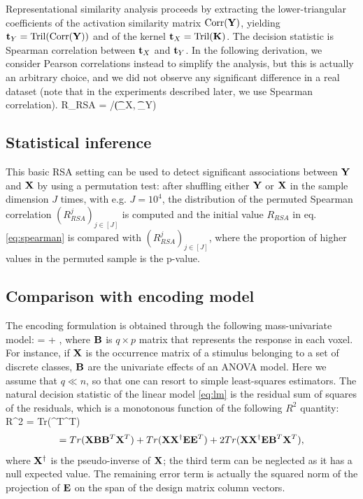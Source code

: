 \documentclass{article}
\begin{document}
Representational similarity analysis proceeds by extracting the
lower-triangular coefficients of the activation similarity matrix
$\text{Corr}(\mathbf{Y})$, yielding $\mathbf{t}_Y = \text{Tril} (\text{Corr}(\mathbf{Y}))$ and of the kernel $\mathbf{t}_X
=\text{Tril}(\mathbf{K})$.  The decision statistic is Spearman correlation
between $\mathbf{t}_X$ and $\mathbf{t}_Y$. 
%
In the following derivation, we consider Pearson correlations instead
to simplify the analysis, but this is actually an arbitrary choice, and
we did not observe any significant difference in a real dataset (note
that in the experiments described later, we use Spearman correlation).
\beq R_{RSA} = /(\t_X, \t_Y)
\label{eq:spearman}
\eeq


\subsection{Statistical inference}
This basic RSA setting can be used to detect significant associations
between $\mathbf{Y}$ and $\mathbf{X}$ by using a permutation test: after shuffling
either $\mathbf{Y}$ or $\mathbf{X}$ in the sample dimension $J$ times, with
e.g. $J=10^4$, the distribution of the permuted Spearman correlation
$(R_{RSA}^j)_{j \in [J]}$ is computed and the initial value $R_{RSA}$
in eq. \ref{eq:spearman} is compared with $(R_{RSA}^j)_{j \in [J]}$,
where the proportion of higher values in the permuted sample is the
p-value.

\subsection{Comparison with encoding model}
The encoding formulation is obtained through the following
mass-univariate model:
\beq
\Y = \X\B + \E,
\label{eq:lm}
\eeq where $\mathbf{B}$ is $q \times p$ matrix that represents the response in
each voxel.  For instance, if $\mathbf{X}$ is the occurrence matrix of a
stimulus belonging to a set of discrete classes, $\mathbf{B}$ are the
univariate effects of an ANOVA model.
%
Here we assume that $q \ll n$, so that one can resort to simple
least-squares estimators.
%
The natural decision statistic of the linear model \eqref{eq:lm} is the
residual sum of squares of the residuals, which is a monotonous
function of the following $R^2$ quantity:
\beq R^2 = Tr(\X\hat{\B}\hat{\B}^T\X^T)\eeq
\begin{equation*} = Tr(\mathbf{X}\mathbf{B}\mathbf{B}^T\mathbf{X}^T) + Tr(\mathbf{X}\mathbf{X}^\dag\mathbf{E}\mathbf{E}^T)
+2 Tr(\mathbf{X}\mathbf{X}^\dag\mathbf{E}\mathbf{B}^T\mathbf{X}^T),
\end{equation*} where
$\mathbf{X}^\dag$ is the pseudo-inverse of $\mathbf{X}$; the third term can be
neglected as it has a null expected value. The remaining error term is
actually the squared norm of the projection of $\mathbf{E}$ on the span of the
design matrix column vectors.
\end{document}
